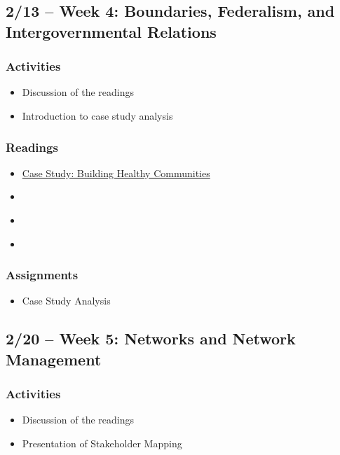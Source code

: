 \documentclass[12pt, letterpaper]{article}
\begin{document}
\subsection*{2/13 -- Week 4: Boundaries, Federalism, and Intergovernmental Relations}
    \subsubsection*{Activities}
        \begin{itemize}
            \item Discussion of the readings
            \item Introduction to case study analysis
        \end{itemize}
    \subsubsection*{Readings}
        \begin{itemize}
           \item \href{https://www.maxwell.syr.edu/docs/default-source/research/parcc/e-parcc/building-a-healthy-community-victoria-lowerson-and-martha-s-feldman-case.pdf?sfvrsn=c38fa74_2}{Case Study: Building Healthy Communities}
            \item \citet[chapter 2]{Agranoff2012}
            \item \citet[chapter 3]{Agranoff2023}
            \item \citet{SCHNEIDER2009a}
        \end{itemize}
    \subsubsection*{Assignments}
        \begin{itemize}
            \item Case Study Analysis
        \end{itemize}         

\subsection*{2/20 -- Week 5: Networks and Network Management}
    \subsubsection*{Activities}
        \begin{itemize}
            \item Discussion of the readings
            \item Presentation of Stakeholder Mapping
        \end{itemize}
\end{document}
